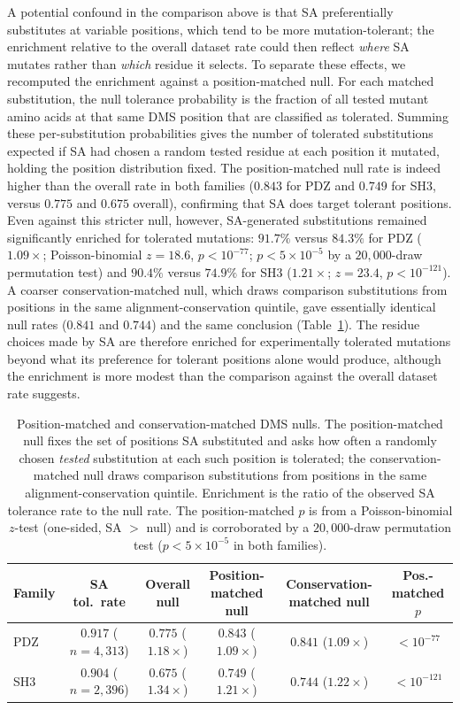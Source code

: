 \documentclass[10pt]{article}
\begin{document}
A potential confound in the comparison above is that SA preferentially substitutes at variable positions, which tend to be more mutation-tolerant; the enrichment relative to the overall dataset rate could then reflect \emph{where} SA mutates rather than \emph{which} residue it selects. To separate these effects, we recomputed the enrichment against a position-matched null. For each matched substitution, the null tolerance probability is the fraction of all tested mutant amino acids at that same DMS position that are classified as tolerated. Summing these per-substitution probabilities gives the number of tolerated substitutions expected if SA had chosen a random tested residue at each position it mutated, holding the position distribution fixed. The position-matched null rate is indeed higher than the overall rate in both families ($0.843$ for PDZ and $0.749$ for SH3, versus $0.775$ and $0.675$ overall), confirming that SA does target tolerant positions. Even against this stricter null, however, SA-generated substitutions remained significantly enriched for tolerated mutations: $91.7\%$ versus $84.3\%$ for PDZ ($1.09\times$; Poisson-binomial $z{=}18.6$, $p < 10^{-77}$; $p < 5\times10^{-5}$ by a $20{,}000$-draw permutation test) and $90.4\%$ versus $74.9\%$ for SH3 ($1.21\times$; $z{=}23.4$, $p < 10^{-121}$). A coarser conservation-matched null, which draws comparison substitutions from positions in the same alignment-conservation quintile, gave essentially identical null rates ($0.841$ and $0.744$) and the same conclusion (Table~\ref{tab:dms-null}). The residue choices made by SA are therefore enriched for experimentally tolerated mutations beyond what its preference for tolerant positions alone would produce, although the enrichment is more modest than the comparison against the overall dataset rate suggests.

\begin{table}[ht]
\centering
\caption{Position-matched and conservation-matched DMS nulls. The position-matched null fixes the set of positions SA substituted and asks how often a randomly chosen \emph{tested} substitution at each such position is tolerated; the conservation-matched null draws comparison substitutions from positions in the same alignment-conservation quintile. Enrichment is the ratio of the observed SA tolerance rate to the null rate. The position-matched $p$ is from a Poisson-binomial $z$-test (one-sided, SA $>$ null) and is corroborated by a $20{,}000$-draw permutation test ($p < 5\times10^{-5}$ in both families).}
\label{tab:dms-null}
\small
\begin{tabular}{@{}lccccc@{}}
\toprule
Family & SA tol.\ rate & Overall null & Position-matched null & Conservation-matched null & Pos.-matched $p$ \\
\midrule
PDZ & $0.917$ ($n{=}4{,}313$) & $0.775$ ($1.18\times$) & $0.843$ ($1.09\times$) & $0.841$ ($1.09\times$) & $<10^{-77}$ \\
SH3 & $0.904$ ($n{=}2{,}396$) & $0.675$ ($1.34\times$) & $0.749$ ($1.21\times$) & $0.744$ ($1.22\times$) & $<10^{-121}$ \\
\bottomrule
\end{tabular}
\end{table}
\end{document}
